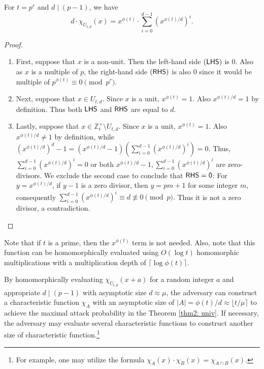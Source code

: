 \documentclass[runningheads]{llncs}
\newcommand{\bb}[1]{\mathbb{#1}}  %
\begin{document}
        \begin{lemma}\label{bfvprf} For $t=p^r$ and $d \mid (p-1)$, we have
            $$d\cdot \chi_{U_{t,d}}(x)=x^{\phi(t)}\cdot\sum_{i=0}^{d-1} \left(x^{\phi(t)/d}\right)^i.$$
        \end{lemma}
        \begin{proof}
        \begin{enumerate}
            \item First, suppose that $x$ is a non-unit. Then the left-hand side $(\sf LHS)$ is $0$. Also as $x$ is a multiple of $p$, the right-hand side $(\sf RHS)$ is also $0$ since it would be multiple of $p^{\phi(t)}\equiv0 \pmod{p^r}$. 
            \item Next, suppose that $x\in U_{t,d}$. Since $x$ is a unit, $x^{\phi(t)}=1$. Also $x^{\phi(t)/d}=1$ by definition. Thus both $\sf LHS$ and $\sf RHS$ are equal to $d$.
            \item Lastly, suppose that $x\in \bb Z_t^\times\setminus U_{t,d}$. Since $x$ is a unit, $x^{\phi(t)}=1$. Also $x^{\phi(t)/d}\neq 1$ by definition, while $(x^{\phi(t)/d})^d-1=(x^{\phi(t)/d}-1)\left(\sum_{i=0}^{d-1} \left(x^{\phi(t)/d}\right)^i\right)=0$.
            Thus, $\sum_{i=0}^{d-1} \left(x^{\phi(t)/d}\right)^i=0$ or both $x^{\phi(t)/d}-1, \sum_{i=0}^{d-1} \left(x^{\phi(t)/d}\right)^i$ are zero-divisors. We exclude the second case to conclude that $\sf RHS=0$: For $y=x^{\phi(t)/d}$, if $y-1$ is a zero divisor, then $y=pm+1$ for some integer $m$, consequently $\sum_{i=0}^{d-1} \left(x^{\phi(t)/d}\right)^i\equiv d\not\equiv0 \pmod p.$ Thus it is not a zero divisor, a contradiction. 
        \end{enumerate} 
        \end{proof}
        Note that if $t$ is a prime, then the $x^{\phi(t)}$ term is not needed. Also, note that this function can be homomorphically evaluated using $O(\log t)$ homomorphic multiplications with a multiplication depth of $\lceil\log\phi(t)\rceil$.
        
        By homomorphically evaluating $\chi_{U_{t,d}}(x+a)$ for a random integer $a$ and appropriate $d\mid (p-1)$ with asymptotic size $d\approx\mu$, the adversary can construct a characteristic function $\chi_A$ with an asymptotic size of $|A|=\phi(t)/d \approx \lfloor t / \mu \rceil$ to achieve the maximal attack probability in the Theorem \ref{thm2: univ}. If necessary, the adversary may evaluate several characteristic functions to construct another size of characteristic function.\footnote{For example, one may utilize the formula $\chi_A(x) \cdot \chi_B(x) = \chi_{A \cap B}(x).$}
\end{document}
